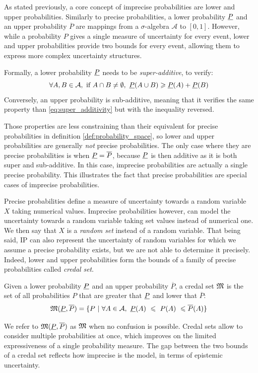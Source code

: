 As stated previously, a core concept of imprecise probabilities are lower and upper probabilities. Similarly to precise probabilities, a lower probability $\underline{P}$ and an upper probability $\overline{P}$ are mappings from a $\sigma$-algebra $\mathcal{A}$ to $[0, 1]$. However, while a probability $P$ gives a single measure of uncertainty for every event, lower and upper probabilities provide two bounds for every event, allowing them to express more complex uncertainty structures.

\begin{remark}
    Formally, a lower probability $\underline{P}$ needs to be \textit{super-additive}, \ie to verify:
    \begin{equation}
        \forall A,B\in\mathcal{A}, \text{ if } A\cap B\neq\emptyset, ~\underline{P}(A\cup B)\geqslant \underline{P}(A)+\underline{P}(B) \label{eq:super_additivity}
    \end{equation}
    Conversely, an upper probability is sub-additive, meaning that it verifies the same property than \cref{eq:super_additivity} but with the inequality reversed.
    
    Those properties are less constraining than their equivalent for precise probabilities in definition \ref{def:probability_space}, so lower and upper probabilities are generally \textit{not} precise probabilities. The only case where they are precise probabilities is when $\underline{P}=\overline{P}$, because $\underline{P}$ is then additive as it is both super and sub-additive. In this case, imprecise probabilities are actually a single precise probability. This illustrates the fact that precise probabilities are special cases of imprecise probabilities. 
\end{remark}

Precise probabilities define a measure of uncertainty towards a random variable $X$ taking numerical values. Imprecise probabilities however, can model the uncertainty towards a random variable taking set values instead of numerical one. We then say that $X$ is a \textit{random set} instead of a random variable. That being said, IP can also represent the uncertainty of random variables for which we assume a precise probability exists, but we are not able to determine it precisely. Indeed, lower and upper probabilities form the bounds of a family of precise probabilities called \textit{credal set}.
\begin{definition}\label{def:credal_set}
    Given a lower probability $\underline{P}$ and an upper probability $\overline{P}$, a credal set $\mathfrak{M}$ is the set of all probabilities $P$ that are greater that $\underline{P}$ and lower that $\overline{P}$:
    \begin{equation}
        \mathfrak{M}(\underline{P}, \overline{P}) = \{P~|~\forall A\in\mathcal{A},~\underline{P}(A)~\leqslant~P(A)~\leqslant\overline{P}(A)\}
    \end{equation}
\end{definition}
We refer to $\mathfrak{M}(\underline{P}, \overline{P})$ as $\mathfrak{M}$ when no confusion is possible. Credal sets allow to consider multiple probabilities at once, which improves on the limited expressiveness of a single probability measure. The gap between the two bounds of a credal set reflects how imprecise is the model, in terms of epistemic uncertainty.


